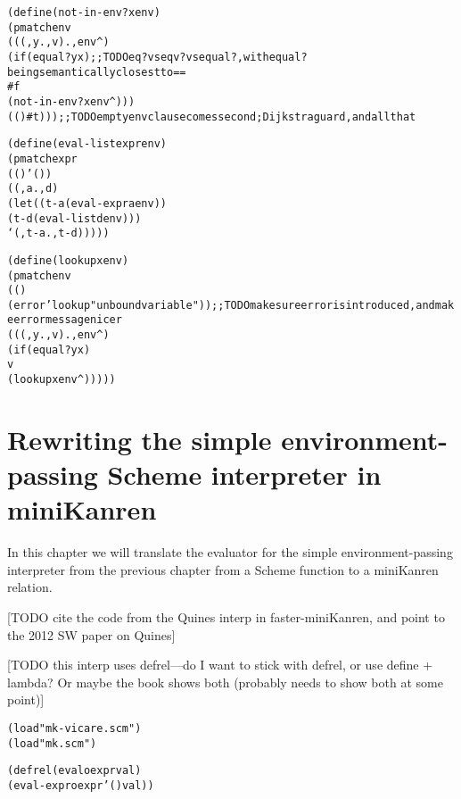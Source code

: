 \documentclass{book}
\begin{document}
\begin{alltt}
(define (not-in-env? x env)
  (pmatch env
    (((,y . ,v) . ,env^)
     (if (equal? y x) ;; TODO eq? vs eqv? vs equal?, with equal? being semantically closest to ==
         #f
         (not-in-env? x env^)))
    (() #t))) ;; TODO empty env clause comes second; Dijkstra guard, and all that
\end{alltt}

\begin{alltt}
(define (eval-list expr env)
  (pmatch expr
    (() '())
    ((,a . ,d)
     (let ((t-a (eval-expr a env))
           (t-d (eval-list d env)))
       `(,t-a . ,t-d)))))
\end{alltt}

\begin{alltt}
(define (lookup x env)
  (pmatch env
    (() (error 'lookup "unbound variable")) ;; TODO make sure error is introduced, and make error message nicer
    (((,y . ,v) . ,env^)
     (if (equal? y x)
         v
         (lookup x env^)))))
\end{alltt}

\chapter{Rewriting the simple environment-passing Scheme interpreter in miniKanren}%

In this chapter we will translate the evaluator for the simple environment-passing interpreter from the previous chapter from a Scheme function to a miniKanren relation.

[TODO cite the code from the Quines interp in faster-miniKanren, and point to the 2012 SW paper on Quines]

[TODO this interp uses defrel---do I want to stick with defrel, or use define + lambda?  Or maybe the book shows both (probably needs to show both at some point)]

\begin{alltt}
(load "mk-vicare.scm")
(load "mk.scm")
\end{alltt}

\begin{alltt}
(defrel (evalo expr val)
  (eval-expro expr '() val))
\end{alltt}
\end{document}
